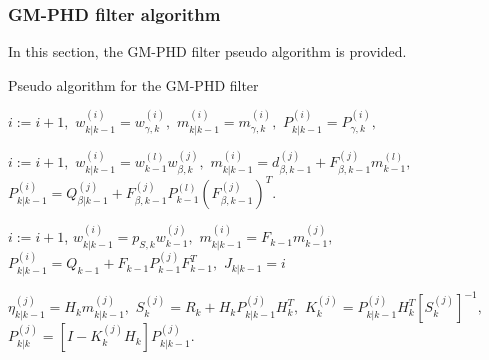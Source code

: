        \subsubsection{GM-PHD filter algorithm}
In this section, the GM-PHD filter pseudo algorithm is provided.
\algrenewcommand{}
\algrenewcommand{}
\algrenewcommand{}
\begin{algorithm}
    \caption{Pseudo algorithm for the GM-PHD filter}
    \begin{algorithmic}[1]

        \State
            \State $i:= i+1,$
            \State $w_{k|k-1}^{(i)} = w_{\gamma,k}^{(i)},$ \quad
            $m_{k|k-1}^{(i)} = m_{\gamma,k}^{(i)},$ \quad
            $P_{k|k-1}^{(i)} = P_{\gamma,k}^{(i)},$
        \EndFor

                \State $i:=i+1,$
                \State $w_{k|k-1}^{(i)} = w_{k-1}^{(l)} w_{\beta,k}^{(j)},$
                \State $m_{k|k-1}^{(i)} = d_{\beta,k-1}^{(j)} + F_{\beta,k-1}^{(j)} m_{k-1}^{(l)},$
                \State $P_{k|k-1}^{(i)} = Q_{\beta|k-1}^{(j)} + F_{\beta,k-1}^{(j)} P_{k-1}^{(l)} (F_{\beta,k-1}^{(j)})^T.$
            \EndFor
        \EndFor
        \EndProcedure
        \State


            \State $i:=i+1$,
            \State $w_{k|k-1}^{(i)} = p_{S,k} w_{k-1}^{(j)},$
            \State $m_{k|k-1}^{(i)} = F_{k-1} m_{k-1}^{(j)},$
            \State $P_{k|k-1}^{(i)} = Q_{k-1} + F_{k-1} P_{k-1}^{(j)} F_{k-1}^T,$
        \EndFor
        \State $J_{k|k-1} = i$
        \EndProcedure

        \State
            \State $\eta_{k|k-1}^{(j)} = H_k m_{k|k-1}^{(j)},$ \quad
             $S_k^{(j)} = R_k + H_k P_{k|k-1}^{(j)} H_k^T,$
            \State $K_k^{(j)} = P_{k|k-1}^{(j)} H_k^T [S_k^{(j)}]^{-1},$ \quad
             $P_{k|k}^{(j)} = [I - K_k^{(j)} H_k] P_{k|k-1}^{(j)}.$
        \EndFor
        \EndProcedure


\end{algorithmic}
\end{algorithm}
